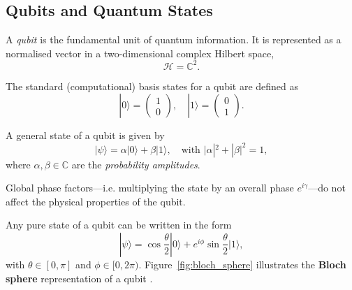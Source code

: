 

\subsection{Qubits and Quantum States}
\label{subsec:qubits}

\begin{definition}[Qubit]
A \emph{\gls{qubit}} is the fundamental unit of quantum information. It is represented as a normalised vector in a two-dimensional complex Hilbert space,
\[
\mathcal{H} = \mathbb{C}^2.
\]
\end{definition}

\begin{notation}
The standard (computational) basis states for a qubit are defined as
\[
|0\rangle = \begin{pmatrix} 1 \\ 0 \end{pmatrix}, \quad |1\rangle = \begin{pmatrix} 0 \\ 1 \end{pmatrix}.
\]
\end{notation}

\begin{definition}
A general state of a \gls{qubit} is given by
\[
|\psi\rangle = \alpha|0\rangle + \beta|1\rangle, \quad \text{with } |\alpha|^2 + |\beta|^2 = 1,
\]
where \(\alpha,\beta \in \mathbb{C}\) are the \emph{probability amplitudes}.
\end{definition}

\begin{remark}
Global phase factors—i.e. multiplying the state by an overall phase \(e^{i\gamma}\)—do not affect the physical properties of the qubit.
\end{remark}

\begin{example}
  Any pure state of a \gls{qubit} can be written in the form
  \[
  |\psi\rangle = \cos\frac{\theta}{2}|0\rangle + e^{i\phi}\sin\frac{\theta}{2}|1\rangle,
  \]
  with \(\theta \in [0,\pi]\) and \(\phi \in [0,2\pi)\). Figure~\ref{fig:bloch_sphere} illustrates the \textbf{Bloch sphere} representation of a qubit \cite{nielsen2010quantum}.
\end{example}

